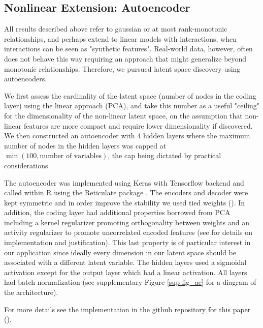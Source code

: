 \documentclass{article}
\begin{document}



\subsection{Nonlinear Extension: Autoencoder}

All results described above refer to gaussian or at most rank-monotonic relationships, and perhaps extend to linear models with interactions, when interactions can be seen as "synthetic features". Real-world data, however, often does not behave this way requiring an approach that might generalize beyond monotonic relationships.  Therefore, we pursued latent space discovery using autoencoders.

We first assess the cardinality of the latent space (number of nodes in the coding layer) using the linear approach (PCA), and take this number as a useful "ceiling" for the dimensionality of the non-linear latent space, on the assumption that non-linear features are more compact and require lower dimensionality if discovered.  We then constructed an autoencoder with 4 hidden layers where the maximum number of nodes in the hidden layers was capped at $\min (100, \textrm{number of variables})$, the cap being dictated by practical considerations.

The autoencoder was implemented using Keras with Tensorflow backend and called within R using the Reticulate package \cite{reticulate_2020}. The encoders and decoder were kept symmetric and in order improve the stability we used tied weights (\cite{pca_ae}). In addition, the coding layer had additional properties borrowed from PCA including a kernel regularizer promoting orthogonality between weights and an activity regularizer to promote uncorrelated encoded features (see \cite{ranjan_build_2019} for details on implementation and justification). This last property is of particular interest in our application since ideally every dimension in our latent space should be associated with a different latent variable. The hidden layers used a sigmoidal activation except for the output layer which had a linear activation. All layers had batch normalization \cite{ioffe2015batch} (see supplementary Figure \ref{sup-fig_ae} for a diagram of the architecture).

For more details see the implementation in the github repository for this paper (\cite{latent_2020}).
\end{document}
